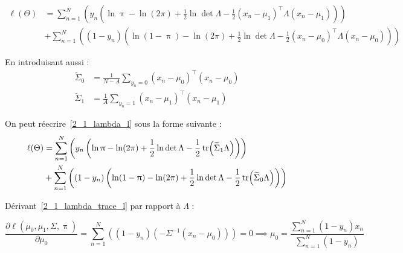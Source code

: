 \documentclass[12pt,a4paper,onecolumn]{article}
\begin{document}
\begin{equation}
	\begin{split}
		\ell(\Theta) & =  \sum_{n = 1}^N
		\left(y_n \left(\ln
			\uppi - \ln(2\pi) + \frac{1}{2}\ln\det\Lambda -\frac{1}{2}(x_n - \mu_1)^\intercal\Lambda(x_n - \mu_1) \right)\right)\\
		&+ 	\sum_{n = 1}^N\left((1 - y_n)
		\left(\ln(1 - \uppi) - \ln(2\pi) + \frac{1}{2}\ln\det\Lambda -\frac{1}{2}(x_n - \mu_0)^\intercal\Lambda(x_n - \mu_0) \right)\right)
	\end{split}
	\label{2_1_lambda_l}
\end{equation}

En introduisant aussi :
\begin{equation}
	\begin{split}
		\widetilde \Sigma_0 &= \frac{1}{N - A}\sum_{y_n = 0} (x_n - \mu_0)^\intercal(x_n - \mu_0) \\
		\widetilde \Sigma_1 &= \frac{1}{A}\sum_{y_n = 1} (x_n - \mu_1)^\intercal(x_n - \mu_1)
	\end{split}
\end{equation}

On peut réecrire~\eqref{2_1_lambda_l} sous la forme suivante :
\begin{equation}
	\begin{split}
		\ell(\Theta) & =  \sum_{n = 1}^N
		\left(y_n \left(\ln
			\uppi - \ln(2\pi) + \frac{1}{2}\ln\det\Lambda -\frac{1}{2}\tr(\widetilde \Sigma_1 \Lambda) \right)\right)\\
		&+ 	\sum_{n = 1}^N\left((1 - y_n)
		\left(\ln(1 - \uppi) - \ln(2\pi) + \frac{1}{2}\ln\det\Lambda -\frac{1}{2}\tr(\widetilde \Sigma_0 \Lambda) \right)\right)
	\end{split}
	\label{2_1_lambda_trace_l}
\end{equation}

Dérivant~\eqref{2_1_lambda_trace_l} par rapport à \( \Lambda\) :

\[
	\frac{\partial \ell(\mu_0, \mu_1, \Sigma, \uppi)}{\partial \mu_0} = 	\sum_{n = 1}^N\left((1 - y_n)(- \Sigma^{-1}(x_n - \mu_0)) \right) = 0
	\implies \mu_0 = \frac{\sum_{n = 1}^N (1 - y_n)x_n}{\sum_{n = 1}^N (1 - y_n)}
\]
\end{document}
